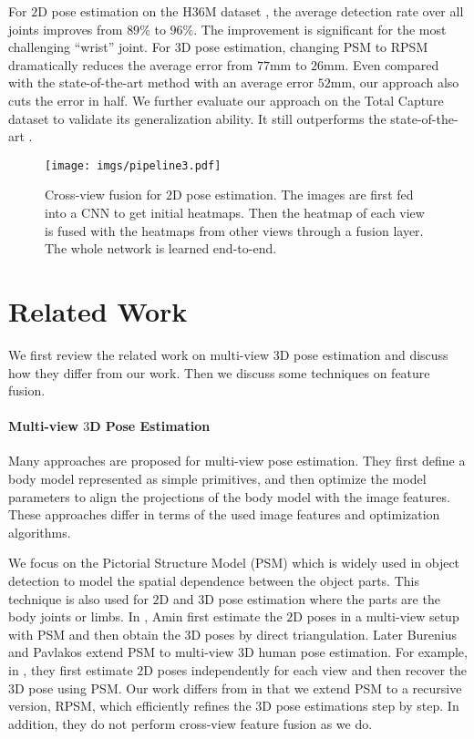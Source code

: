 \documentclass[10pt,twocolumn,letterpaper]{article}
\begin{document}
For $2$D pose estimation on the H36M dataset \cite{ionescu2014human3}, the average detection rate over all joints improves from $89\%$ to $96\%$. The improvement is significant for the most challenging ``wrist'' joint. For $3$D pose estimation, changing PSM to RPSM dramatically reduces the average error from $77$mm to $26$mm. Even compared with the state-of-the-art method with an average error $52$mm, our approach also cuts the error in half. We further evaluate our approach on the Total Capture dataset \cite{trumble2017total} to validate its generalization ability. It still outperforms the state-of-the-art \cite{trumble2018deep}.

\begin{figure}
	\centering
	\texttt{[image: imgs/pipeline3.pdf]}
	\caption{Cross-view fusion for $2$D pose estimation. The images are first fed into a CNN to get initial heatmaps. Then the heatmap of each view is fused with the heatmaps from other views through a fusion layer.  The whole network is learned end-to-end.}
	\label{fig:pipeline}
\end{figure}

\section{Related Work}
We first review the related work on multi-view $3$D pose estimation and discuss how they differ from our work. Then we discuss some techniques on feature fusion. 

\paragraph{Multi-view $3$D Pose Estimation} Many approaches \cite{liu2011markerless,gall2010optimization,burenius20133D,PavlakosZDD17,belagiannis20143D,Rhodin_2018_ECCV,rhodin2018learning} are proposed for multi-view pose estimation. They first define a body model represented as simple primitives, and then optimize the model parameters to align the projections of the body model with the image features. These approaches differ in terms of the used image features and optimization algorithms.


We focus on the Pictorial Structure Model (PSM) which is widely used in object detection \cite{felzenszwalb2005pictorial,fischler1973representation} to model the spatial dependence between the object parts. This technique is also used for $2$D \cite{yang2011articulated,chen2014articulated,amin2013multi} and $3$D \cite{burenius20133D,PavlakosZDD17} pose estimation where the parts are the body joints or limbs. In \cite{amin2013multi}, Amin \etal first estimate the $2$D poses in a multi-view setup with PSM and then obtain the $3$D poses by direct triangulation. Later Burenius \etal \cite{burenius20133D} and Pavlakos \etal \cite{PavlakosZDD17} extend PSM to multi-view $3$D human pose estimation. For example, in \cite{PavlakosZDD17}, they first estimate $2$D poses independently for each view and then recover the $3$D pose using PSM. Our work differs from \cite{PavlakosZDD17} in that we extend PSM to a recursive version, \ie RPSM, which efficiently refines the 3D pose estimations step by step. In addition, they \cite{PavlakosZDD17} do not perform cross-view feature fusion as we do.
\end{document}
